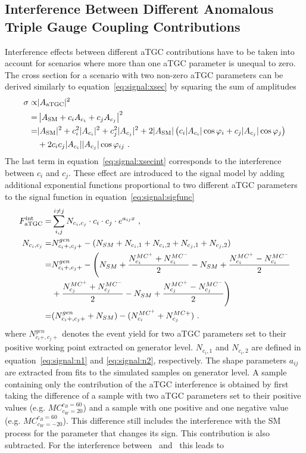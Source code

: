 \subsection{Interference Between Different Anomalous Triple Gauge Coupling Contributions}
\label{subsec:signal:aTGCInt}
Interference effects between different aTGC contributions have to be taken into account for scenarios where more than one aTGC parameter is unequal to zero. The cross section for a scenario with two non-zero aTGC parameters can be derived similarly to equation~\ref{eq:signal:xsec} by squaring the sum of amplitudes
\begin{align}
\sigma \propto& |A_{\rm aTGC}|^2 \\
=& \left| A_{\rm SM} + c_i A_{c_i} + c_j A_{c_j} \right|^2 \\
=& |A_{\rm SM}|^2 + c_i^2 |A_{c_i}|^2 + c_j^2 |A_{c_j}|^2 + 2|A_{\rm SM}|\left( c_i|A_{c_i}|\cos \varphi_i + c_j|A_{c_j}|\cos \varphi_j\right) \nonumber \\
&+ 2c_ic_j|A_{c_i}||A_{c_j}|\cos \varphi_{ij} ~. \label{eq:signal:xsecint}
\end{align}
The last term in equation~\ref{eq:signal:xsecint} corresponds to the interference between $c_i$ and $c_j$. These effect are introduced to the signal model by adding additional exponential functions proportional to two different aTGC parameters to the signal function in equation~\ref{eq:signal:sigfunc}
\begin{align}
F_{\rm aTGC}^{\rm int} =& \sum_{i,j}^{i \neq j} N_{c_i,c_j} \cdot c_i \cdot c_j \cdot e^{a_{ij}x} ~, \\
N_{c_i,c_j} =& N_{c_i+,c_j+}^{gen} - (N_{SM} + N_{c_i,1} + N_{c_i,2} + N_{c_j,1} + N_{c_j,2}) \\ 
	=& N_{c_i+,c_j+}^{gen} - \Bigg(N_{SM} + \frac{N_{c_i}^{MC^+}+N_{c_i}^{MC^-}}{2}-N_{SM} + \frac{N_{c_i}^{MC^+}-N_{c_i}^{MC^-}}{2} \\ 
	&+ \frac{N_{c_j}^{MC^+}+N_{c_j}^{MC^-}}{2}-N_{SM} + \frac{N_{c_j}^{MC^+}-N_{c_j}^{MC^-}}{2} \Bigg) \nonumber \\ 
	=&(N_{c_i+,c_j+}^{gen}+N_{SM})-(N_{c_i}^{MC^+}+N_{c_j}^{MC+}) ~. 
\end{align}
where $N_{c_i+,c_j+}^{gen}$ denotes the event yield for two aTGC parameters set to their positive working point extracted on generator level. $N_{c_i,1}$ and $N_{c_i,2}$ are defined in equation~\ref{eq:signal:n1} and \ref{eq:signal:n2}, respectively. The shape parameters $a_{ij}$ are extracted from fits to the simulated samples on generator level. A sample containing only the contribution of the aTGC interference is obtained by first taking the difference of a sample with two aTGC parameters set to their positive values (e.g. $MC_{c_{W} =20}^{c_{B} =60}$) and a sample with one positive and one negative value (e.g. $MC_{c_{W}=-20}^{c_{B} =60}$). This difference still includes the interference with the SM process for the parameter that changes its sign. This contribution is also subtracted. For the interference between \Tccw \ and \Tcb \ this leads to
